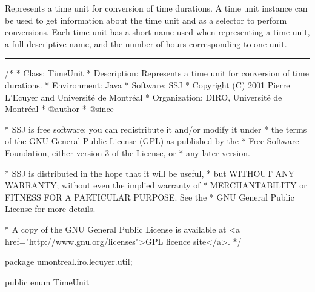 
Represents a time unit for conversion of time durations.
A time unit instance can be used to get information about
the time unit and as a selector to perform conversions.
Each time unit has a short name used when representing a time unit,
a full descriptive name, and the number of hours corresponding to one unit.

\bigskip\hrule

\begin{code}
\begin{hide}
/*
 * Class:        TimeUnit
 * Description:  Represents a time unit for conversion of time durations.
 * Environment:  Java
 * Software:     SSJ 
 * Copyright (C) 2001  Pierre L'Ecuyer and Université de Montréal
 * Organization: DIRO, Université de Montréal
 * @author       
 * @since

 * SSJ is free software: you can redistribute it and/or modify it under
 * the terms of the GNU General Public License (GPL) as published by the
 * Free Software Foundation, either version 3 of the License, or
 * any later version.

 * SSJ is distributed in the hope that it will be useful,
 * but WITHOUT ANY WARRANTY; without even the implied warranty of
 * MERCHANTABILITY or FITNESS FOR A PARTICULAR PURPOSE.  See the
 * GNU General Public License for more details.

 * A copy of the GNU General Public License is available at
   <a href="http://www.gnu.org/licenses">GPL licence site</a>.
 */
\end{hide}
package umontreal.iro.lecuyer.util;


public enum TimeUnit\begin{hide} {
\end{hide}\end{code}
